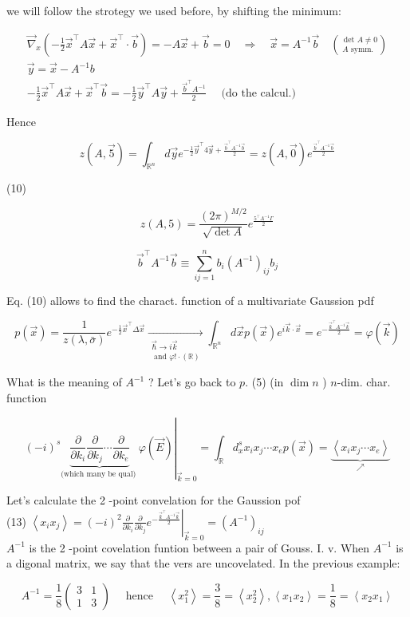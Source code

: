 \documentclass[10pt]{article}
\begin{document}
we will follow the strotegy we used before, by shifting the minimum:

$$
\begin{gathered}
\vec{\nabla}_{x}\left(-\frac{1}{2} \vec{x}^{\top} A \vec{x}+\vec{x}^{\top} \cdot \vec{b}\right)=-A \vec{x}+\vec{b}=0 \quad \Rightarrow \quad \vec{x}=A^{-1} \vec{b} \quad\binom{\text { det } A \neq 0}{A \text { symm. }} \\
\vec{y}=\vec{x}-A^{-1} b \\
-\frac{1}{2} \vec{x}^{\top} A \vec{x}+\vec{x}^{\top} \vec{b}=-\frac{1}{2} \vec{y}^{\top} A \vec{y}+\frac{\vec{b}^{\top} A^{-1}}{2} \quad \text { (do the calcul.) }
\end{gathered}
$$

Hence

$$
z(A, \overrightarrow{5})=\int_{\mathbb{R}^{n}} d \vec{y} e^{-\frac{1}{2} \vec{y}^{\top} 4 \vec{y}+\frac{\vec{b}^{\top} A^{-1} \vec{b}}{2}}=z(A, \overrightarrow{0}) e^{\frac{\vec{b}^{\top} A^{-1} \vec{b}}{2}}
$$

(10)

$$
z(A, 5)=\frac{(2 \pi)^{M / 2}}{\sqrt{\operatorname{det} A}} e^{\frac{5^{\top} A^{-1} \Gamma}{2}}
$$

$$
\vec{b}^{\top} A^{-1} \vec{b} \equiv \sum_{i j=1}^{n} b_{i}\left(A^{-1}\right)_{i j} b_{j}
$$

Eq. (10) allows to find the charact. function of a multivariate Gaussion pdf


\begin{equation*}
p(\vec{x})=\frac{1}{z(\lambda, \bar{\sigma})} e^{-\frac{1}{2} \vec{x}^{\top} \Delta \vec{x}} \underset{\substack{\vec{\hbar} \rightarrow i \vec{k} \\ \text { and } \varphi!\cdot(\mathbb{R})}}{\longrightarrow} \int_{\mathbb{R}^{n}} d \vec{x} p(\vec{x}) e^{i \vec{k} \cdot \vec{x}}=e^{-\frac{\vec{k}^{\top} A^{-1} \vec{k}}{2}}=\varphi(\vec{k}) \tag{11}
\end{equation*}


What is the meaning of $A^{-1}$ ? Let's go back to $p$. (5) (in $\operatorname{dim} n$ ) $n$-dim. char. function

$$
\left.(-i)^{s} \underbrace{\frac{\partial}{\partial k_{i}} \frac{\partial}{\partial k_{j}} \cdots \frac{\partial}{\partial k_{e}}}_{\text {(which many be qual) }} \varphi(\vec{E})\right|_{\vec{k}=0}=\int_{\mathbb{R}} d_{x}^{s} x_{i} x_{j} \cdots x_{e} p(\vec{x})=\underbrace{\left\langle x_{i} x_{j} \cdots x_{e}\right\rangle}_{\nearrow}
$$

Let's calculate the 2 -point convelation for the Gaussion pof\\
(13) $\left\langle x_{i} x_{j}\right\rangle=\left.(-i)^{2} \frac{\partial}{\partial k_{i}} \frac{\partial}{\partial k_{j}} e^{-\frac{\vec{k}^{\top} A^{-1} \vec{k}}{2}}\right|_{\vec{k}=0}=\left(A^{-1}\right)_{i j}$\\
$A^{-1}$ is the 2 -point covelation funtion between a pair of Gouss. I. v. When $A^{-1}$ is a digonal matrix, we say that the vers are uncovelated. In the previous example:

$$
A^{-1}=\frac{1}{8}\left(\begin{array}{ll}
3 & 1 \\
1 & 3
\end{array}\right) \quad \text { hence } \quad\left\langle x_{1}^{2}\right\rangle=\frac{3}{8}=\left\langle x_{2}^{2}\right\rangle,\left\langle x_{1} x_{2}\right\rangle=\frac{1}{8}=\left\langle x_{2} x_{1}\right\rangle
$$
\end{document}
